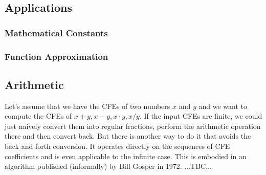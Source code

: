 


\subsection{Applications}


\subsubsection{Mathematical Constants}







\subsubsection{Function Approximation}





\subsection{Arithmetic}
Let's assume that we have the CFEs of two numbers $x$ and $y$ and we want to compute the CFEs of $x + y, x - y, x \cdot y, x / y$. If the input CFEs are finite, we could just naively convert them into regular fractions, perform the arithmetic operation there and then convert back. But there is another way to do it that avoids the back and forth conversion. It operates directly on the sequences of CFE coefficients and is even applicable to the infinite case. This is embodied in an algorithm published (informally) by Bill Gosper in 1972. ...TBC...

